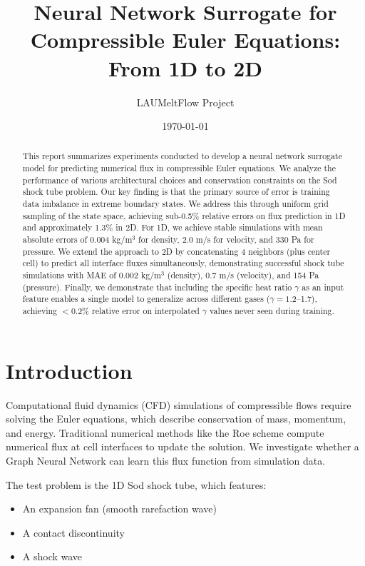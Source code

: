 \documentclass[11pt,a4paper]{article}
\title{Neural Network Surrogate for Compressible Euler Equations:\\From 1D to 2D}
\author{LAUMeltFlow Project}
\date{\today}
\begin{document}
\maketitle

\begin{abstract}
This report summarizes experiments conducted to develop a neural network surrogate model for predicting numerical flux in compressible Euler equations. We analyze the performance of various architectural choices and conservation constraints on the Sod shock tube problem. Our key finding is that the primary source of error is training data imbalance in extreme boundary states. We address this through uniform grid sampling of the state space, achieving sub-0.5\% relative errors on flux prediction in 1D and approximately 1.3\% in 2D. For 1D, we achieve stable simulations with mean absolute errors of 0.004 kg/m$^3$ for density, 2.0 m/s for velocity, and 330 Pa for pressure. We extend the approach to 2D by concatenating 4 neighbors (plus center cell) to predict all interface fluxes simultaneously, demonstrating successful shock tube simulations with MAE of 0.002 kg/m$^3$ (density), 0.7 m/s (velocity), and 154 Pa (pressure). Finally, we demonstrate that including the specific heat ratio $\gamma$ as an input feature enables a single model to generalize across different gases ($\gamma = 1.2$--1.7), achieving $<$0.2\% relative error on interpolated $\gamma$ values never seen during training.
\end{abstract}

\section{Introduction}

Computational fluid dynamics (CFD) simulations of compressible flows require solving the Euler equations, which describe conservation of mass, momentum, and energy. Traditional numerical methods like the Roe scheme compute numerical flux at cell interfaces to update the solution. We investigate whether a Graph Neural Network can learn this flux function from simulation data.

The test problem is the 1D Sod shock tube, which features:
\begin{itemize}
    \item An expansion fan (smooth rarefaction wave)
    \item A contact discontinuity
    \item A shock wave
\end{itemize}
\end{document}
